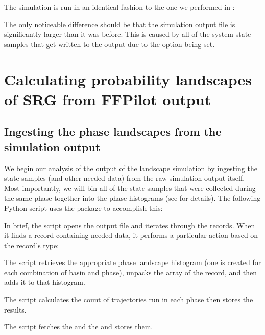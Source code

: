 The simulation is run in an identical fashion to the one we performed in :


The only noticeable difference should be that the simulation output file is significantly larger than it was before. This is caused by all of the system state samples that get written to the output due to the  option being set.

\section{Calculating probability landscapes of SRG from FFPilot output}\label{sec:landscape_srg}

\subsection{Ingesting the phase landscapes from the simulation output}
We begin our analysis of the output of the  landscape simulation by ingesting the state samples (and other needed data) from the raw simulation output itself. Most importantly, we will bin all of the state samples that were collected during the same phase together into the phase histograms (see  for details). The following Python script uses the  package to accomplish this:


In brief, the script opens the output file and iterates through the records. When it finds a record containing needed data, it performs a particular action based on the record's type:
\begin{description}[style=nextline]
    \item[SpeciesTimeSeries]
        The script retrieves the appropriate phase landscape histogram (one is created for each combination of basin and phase), unpacks the  array of the record, and then adds it to that histogram.
    \item[FFluxStageOutputRaw (turn on with \code{FFluxStageOutputRaw} option)]
        The script calculates the count of trajectories run in each phase then stores the results.
    \item[FFluxStageOutputSummary (on by default)]
        The script fetches the  and the  and stores them.
\end{description}

